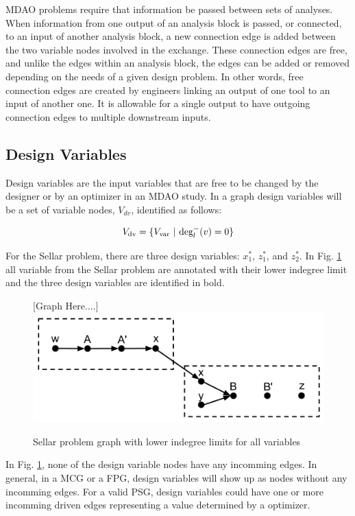 MDAO problems require that information be passed between sets of analyses. When 
information from one output of an analysis block is passed, or connected, to an 
input of another analysis block, a new connection edge is added between the two 
variable nodes involved in the exchange. These connection edges are free, and unlike the edges 
within an analysis block, the edges can be added or removed depending on the needs
of a given design problem. In other words, free connection edges are created by 
engineers linking an output of one tool to an input of another one. It is 
allowable for a single output to have outgoing connection edges to multiple 
downstream inputs. 

\subsection{Design Variables}
Design variables are the input variables that are free to be 
changed by the designer or by an optimizer in an MDAO study. In a graph design
variables will be a set of variable nodes, $V_{dv}$, identified as follows: 

\begin{equation}
  V_{\textrm{dv}} = \{V_{\textrm{var}} \ | \  \textrm{deg}_l^-(v)=0\}
\end{equation}

For the Sellar problem, there are three design variables: $x_1^*$, $z_1^*$, and 
$z_2^*$. In Fig. \ref{f:designvars} all variable from the Sellar problem are 
annotated with their lower indegree limit and the three design variables are identified 
in bold. 

\begin{figure}[htb!]
  \begin{center}
    [Graph Here....]
    \includegraphics[width=.6\textwidth]{images/design_vars_graph}
  \end{center}
  \caption{Sellar problem graph with lower indegree limits for all variables \label{f:designvars}}
\end{figure}

In Fig. \ref{f:designvars}, none of the design variable nodes have any incomming 
edges. In general, in a MCG or a FPG, design variables will 
show up as nodes without any incomming edges. For a valid PSG, design variables 
could have one or more incomming driven edges representing a value determined by 
a optimizer. 

